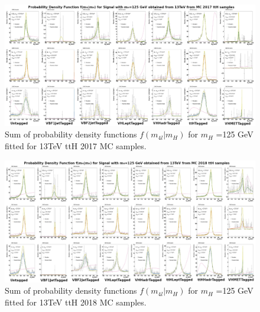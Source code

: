 \begin{figure}
    \centering
    \includegraphics[scale=1]{images/2017.jpg}
    \caption{Sum of probability density functions $f(m_{4l} |m_H)$ for $m_H$ =125 GeV fitted for 13TeV ttH 2017 MC samples.}
    \label{fig:2017}
\end{figure}
\begin{figure}
    \centering
    \includegraphics[scale=1]{images/2018.jpg}
    \caption{Sum of probability density functions $f(m_{4l} |m_H)$ for $m_H$ =125 GeV fitted for 13TeV ttH 2018 MC samples.}
    \label{fig:2018}
\end{figure}

